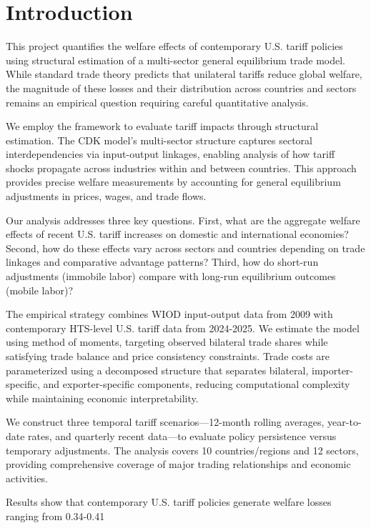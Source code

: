 \section{Introduction}

This project quantifies the welfare effects of contemporary U.S. tariff policies using structural estimation of a multi-sector general equilibrium trade model. While standard trade theory predicts that unilateral tariffs reduce global welfare, the magnitude of these losses and their distribution across countries and sectors remains an empirical question requiring careful quantitative analysis.

We employ the \cite{costinot2012TheReviewofEconomicStudies} framework to evaluate tariff impacts through structural estimation. The CDK model's multi-sector structure captures sectoral interdependencies via input-output linkages, enabling analysis of how tariff shocks propagate across industries within and between countries. This approach provides precise welfare measurements by accounting for general equilibrium adjustments in prices, wages, and trade flows.

Our analysis addresses three key questions. First, what are the aggregate welfare effects of recent U.S. tariff increases on domestic and international economies? Second, how do these effects vary across sectors and countries depending on trade linkages and comparative advantage patterns? Third, how do short-run adjustments (immobile labor) compare with long-run equilibrium outcomes (mobile labor)?

The empirical strategy combines WIOD input-output data from 2009 with contemporary HTS-level U.S. tariff data from 2024-2025. We estimate the model using method of moments, targeting observed bilateral trade shares while satisfying trade balance and price consistency constraints. Trade costs are parameterized using a decomposed structure that separates bilateral, importer-specific, and exporter-specific components, reducing computational complexity while maintaining economic interpretability.

We construct three temporal tariff scenarios—12-month rolling averages, year-to-date rates, and quarterly recent data—to evaluate policy persistence versus temporary adjustments. The analysis covers 10 countries/regions and 12 sectors, providing comprehensive coverage of major trading relationships and economic activities.

Results show that contemporary U.S. tariff policies generate welfare losses ranging from 0.34-0.41%
